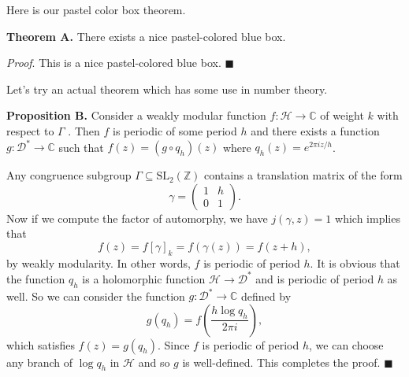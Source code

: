 \documentclass[11pt,oneside]{article}
\begin{document}
 

Here is our pastel color box theorem.

\begin{myAwesomeBox}
    \textbf{Theorem A.} There exists a nice pastel-colored blue box.
\end{myAwesomeBox}

\begin{anotherAwesomeBox}
    \textit{Proof}. This is a nice pastel-colored blue box. $\blacksquare$
\end{anotherAwesomeBox}

\medskip

Let's try an actual theorem which has some use in number theory.

\begin{myAwesomeBox}
    \textbf{Proposition B.} Consider a weakly modular function $ f: \mathcal{H} \to \mathbb{C} $ of weight $ k $ with respect to $ \Gamma $ . Then $ f $ is periodic of some period $ h $ and there exists a function $ g: \mathcal{D^*} \to \mathbb{C} $ such that $ f(z) = (g \circ q_h)(z) $ where $ q_h(z) = e^{2 \pi i z/h} $.
\end{myAwesomeBox}

\begin{proofBox}
    Any congruence subgroup $ \Gamma \subseteq \mathrm{SL}_2(\mathbb{Z}) $ contains a translation matrix of the form
    \[
       \gamma = \begin{pmatrix}
           1 & h \\
           0 & 1
       \end{pmatrix}.
    \]
    Now if we compute the factor of automorphy, we have $ j(\gamma, z) = 1 $ which implies that
    \[
       f(z) = f[\gamma]_k = f(\gamma(z)) = f(z + h),
    \]
    by weakly modularity. In other words, $ f $ is periodic of period $ h $. It is obvious that the function $ q_h $ is a holomorphic function $ \mathcal{H} \to \mathcal{D^*} $ and is periodic of period $ h $ as well. So we can consider the function $ g: \mathcal{D^*} \to \mathbb{C} $ defined by
    \[
       g(q_h) = f \left( \frac{h \log q_h}{2 \pi i} \right),
    \]
    which satisfies $ f(z) = g(q_h) $. Since $ f $ is periodic of period $ h $, we can choose any branch of $ \log q_h $ in $ \mathcal{H} $ and so $ g $ is well-defined. This completes the proof. $ \blacksquare$
\end{proofBox}
\end{document}
